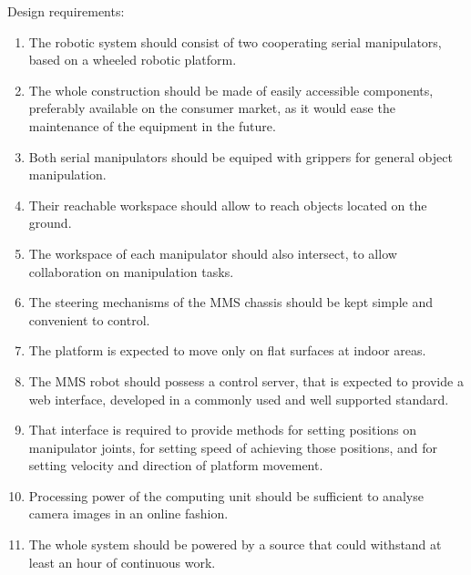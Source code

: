 Design requirements:
\begin{enumerate}
\item The robotic system should consist of two cooperating serial manipulators, based on a wheeled robotic platform.
\item The whole construction should be made of easily accessible components, preferably available on the consumer market, as it would ease the maintenance of the equipment in the future.
\item Both serial manipulators should be equiped with grippers for general object manipulation.
\item Their reachable workspace should allow to reach objects located on the ground.
\item The workspace of each manipulator should also intersect, to allow collaboration on manipulation tasks.
\item The steering mechanisms of the MMS chassis should be kept simple and convenient to control.
\item The platform is expected to move only on flat surfaces at indoor areas.
\item The MMS robot should possess a control server, that is expected to provide a web interface, developed in a commonly used and well supported standard.
\item That interface is required to provide methods for setting positions on manipulator joints, for setting speed of achieving those positions, and for setting velocity and direction of platform movement. 
\item Processing power of the computing unit should be sufficient to analyse camera images in an online fashion. 
\item The whole system should be powered by a source that could withstand at least an hour of continuous work.
\end{enumerate}

